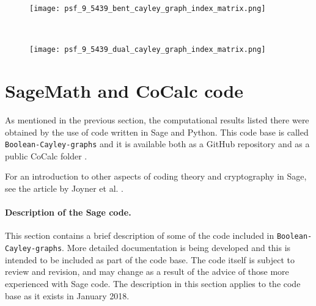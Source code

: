 \documentclass[12pt,a4paper]{article}
\begin{document}
\begin{figure}[!bhpt] %
\centering
\begin{minipage}{.48\textwidth}
  \centering
  \texttt{[image: psf\_9\_5439\_bent\_cayley\_graph\_index\_matrix.png]}
  \label{fig:psf_9_5439_bent_cayley_graph_index_matrix}
\end{minipage}
~~
\begin{minipage}{.48\textwidth}
  \centering
  \texttt{[image: psf\_9\_5439\_dual\_cayley\_graph\_index\_matrix.png]}
  \label{fig:psf_9_5439_dual_cayley_graph_index_matrix}
\end{minipage}%
\end{figure}


\newpage
\section{SageMath and CoCalc code}
\label{sec-Code}
As mentioned in the previous section, the computational results listed there were obtained by the
use of code written in Sage \cite{JoyEtAl13Sage} \cite{SageMath7517} and Python.
This code base is called \texttt{Boolean-Cayley-graphs} and it is available both as a GitHub
repository \cite{Leo16GitHub} and as a public CoCalc \cite{CoCalc} folder
\cite{Leo17CoCalc}.

For an introduction to other aspects of coding theory and cryptography in Sage,
see the article by Joyner et al. \cite{JoyEtAl13Sage}.

\paragraph*{Description of the Sage code.}

This section contains a brief description of some of the code included in
\texttt{Boolean-Cayley-graphs}.
More detailed documentation is being developed and this is intended to be included as part of the code base.
The code itself is subject to review and revision, and may change as a result of the advice of
those more experienced with Sage code.
The description in this section applies to the code base as it exists in January 2018.
\end{document}
